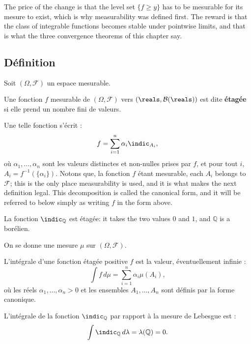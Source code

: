 \medskip
The price of the change is that the level set $\{f \geq y\}$ has to be mesurable for
its mesure to exist, which is why measurability was defined first. The reward is
that the class of integrable functions becomes stable under pointwise limits, and
that is what the three convergence theorems of this chapter say.

\subsection{Définition}

Soit $(\Omega,\mathcal{F})$ un espace mesurable.

\begin{definition}
  Une fonction $f$ mesurable de $(\Omega,\mathcal{F})$ vers
  $(\reals,\mathcal{B}(\reals))$ est dite \textbf{étagée} si elle prend un nombre
  fini de valeurs.
\end{definition}

Une telle fonction s'écrit :
\[
  f = \sum_{i=1}^{n} \alpha_{i} \indic_{A_{i}},
\]
où $\alpha_{1},\ldots,\alpha_{n}$ sont les valeurs distinctes et non-nulles prises
par $f$, et pour tout $i$, $A_{i} = f^{-1}(\{\alpha_{i}\})$. Notons que, la fonction
$f$ étant mesurable, each $A_{i}$ belongs to $\mathcal{F}$; this is the only place
measurability is used, and it is what makes the next definition legal. This
decomposition is called the canonical form, and it will be referred to below simply
as writing $f$ in the form above.

\begin{example}
  La fonction $\indic_{\mathbb{Q}}$ est étagée: it takes the two values $0$ and $1$,
  and $\mathbb{Q}$ is a borélien.
\end{example}

On se donne une mesure $\mu$ sur $(\Omega,\mathcal{F})$.

\begin{definition}
  L'intégrale d'une fonction étagée positive $f$ est la valeur, éventuellement
  infinie :
  \[
    \int f \, d\mu = \sum_{i=1}^{n} \alpha_{i} \mu(A_{i}),
  \]
  où les réels $\alpha_{1},\ldots,\alpha_{n} > 0$ et les ensembles
  $A_{1},\ldots,A_{n}$ sont définis par la forme canonique.
\end{definition}

\begin{example}
  L'intégrale de la fonction $\indic_{\mathbb{Q}}$ par rapport à la mesure de
  Lebesgue est :
  \[
    \int \indic_{\mathbb{Q}} \, d\lambda = \lambda(\mathbb{Q}) = 0 .
  \]
\end{example}


